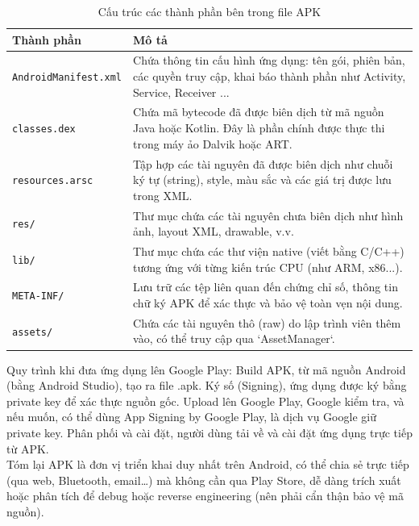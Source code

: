         \begin{table}[H]
            \centering
            \renewcommand{\arraystretch}{1.5}
            \begin{tabular}{|l|p{11cm}|}
                \hline
                \textbf{Thành phần} & \textbf{Mô tả} \\
                \hline
                \texttt{AndroidManifest.xml} & Chứa thông tin cấu hình ứng dụng: tên gói, phiên bản, các quyền truy cập, khai báo thành phần như Activity, Service, Receiver \cite{AndroidManifest.xml}... \\
                \hline
                \texttt{classes.dex} & Chứa mã bytecode đã được biên dịch từ mã nguồn Java hoặc Kotlin. Đây là phần chính được thực thi trong máy ảo Dalvik hoặc ART. \\
                \hline
                \texttt{resources.arsc} & Tập hợp các tài nguyên đã được biên dịch như chuỗi ký tự (string), style, màu sắc và các giá trị được lưu trong XML. \\
                \hline
                \texttt{res/} & Thư mục chứa các tài nguyên chưa biên dịch như hình ảnh, layout XML, drawable, v.v. \\
                \hline
                \texttt{lib/} & Thư mục chứa các thư viện native (viết bằng C/C++) tương ứng với từng kiến trúc CPU (như ARM, x86...). \\
                \hline
                \texttt{META-INF/} & Lưu trữ các tệp liên quan đến chứng chỉ số, thông tin chữ ký APK để xác thực và bảo vệ toàn vẹn nội dung. \\
                \hline
                \texttt{assets/} & Chứa các tài nguyên thô (raw) do lập trình viên thêm vào, có thể truy cập qua `AssetManager`. \\
                \hline
            \end{tabular}
            \caption{Cấu trúc các thành phần bên trong file APK}
            \label{table:apk-structure}
            \end{table}            
    
        Quy trình khi đưa ứng dụng lên Google Play: Build APK, từ mã nguồn Android (bằng Android Studio), tạo ra file .apk. Ký số (Signing), ứng dụng được ký bằng private key để xác thực nguồn gốc. Upload lên Google Play, Google kiểm tra, và nếu muốn, có thể dùng App Signing by Google Play, là dịch vụ Google giữ private key. Phân phối và cài đặt, người dùng tải về và cài đặt ứng dụng trực tiếp từ APK.\\

        Tóm lại APK là đơn vị triển khai duy nhất trên Android, có thể chia sẻ trực tiếp (qua web, Bluetooth, email…) mà không cần qua Play Store, dễ dàng trích xuất hoặc phân tích để debug hoặc reverse engineering (nên phải cẩn thận bảo vệ mã nguồn).
